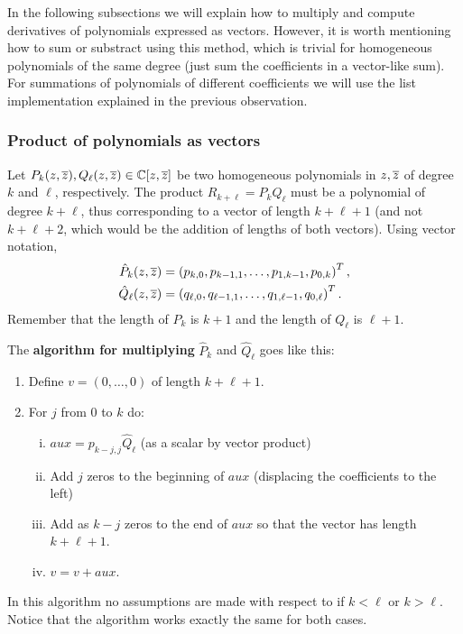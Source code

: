 In the following subsections we will explain how to multiply and compute derivatives of polynomials expressed as vectors. However, it is worth mentioning how to sum or substract using this method, which is trivial for homogeneous polynomials of the same degree (just sum the coefficients in a vector-like sum). For summations of polynomials of different coefficients we will use the list implementation explained in the previous observation.




\subsubsection{Product of polynomials as vectors}

Let $P_k(z,\overline{z}),Q_{\ell}(z,\overline{z})\in\mathbb{C}[z,\overline{z}]$ be two homogeneous polynomials in $z,\overline{z}$ of degree $k$ and $\ell$, respectively. The product $R_{k+\ell}=P_kQ_{\ell}$ must be a polynomial of degree $k+\ell$, thus corresponding to a vector of length $k+\ell+1$ (and not $k+\ell+2$, which would be the addition of lengths of both vectors). Using vector notation,
\begin{align*}
\hat P_k(z,\overline{z})&=\left(p_{k,0},p_{k-1,1},\dots,p_{1,k-1},p_{0,k}\right)^T,\\
\hat Q_\ell(z,\overline{z}) &= \left(q_{\ell,0},q_{\ell-1,1},\dots,q_{1,\ell-1},q_{0,\ell}\right)^T.
\end{align*}
Remember that the length of $P_k$ is $k+1$ and the length of $Q_{\ell}$ is $\ell+1$. 

The \textbf{algorithm for multiplying} $\hat P_k$ and $\hat Q_{\ell}$ goes like this:
\begin{enumerate}
\item
Define $v=(0,\dots,0)$ of length $k+\ell+1$.
\item
For $j$ from 0 to $k$ do:
\begin{enumerate}[(i)]
\item
$aux = p_{k-j,j} \hat Q_{\ell}$ (as a scalar by vector product)
\item
Add $j$ zeros to the beginning of $aux$ (displacing the coefficients to the left)
\item
Add as $k-j$ zeros to the end of $aux$ so that the vector has length $k+\ell+1$.
\item
$v = v+aux$.
\end{enumerate}
\end{enumerate}

\begin{observacio}
In this algorithm no assumptions are made with respect to if $k<\ell$ or $k>\ell$. Notice that the algorithm works exactly the same for both cases.
\end{observacio}

